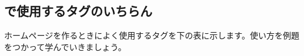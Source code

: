 \begin{tcolorbox}[title=\useOmetoi,breakable]
  \begin{enumerate}
  \end{enumerate}
\end{tcolorbox}
\clearpage




%
%
\subsection{で使用するタグのいちらん}

ホームページを作るときによく使用するタグを下の表に示します。使い方を例題をつかって学んでいきましょう。

